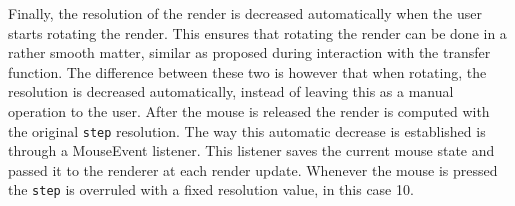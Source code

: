 Finally, the resolution of the render is decreased automatically when the user starts rotating the render. This ensures that rotating the render can be done in a rather smooth matter, similar as proposed during interaction with the transfer function. The difference between these two is however that when rotating, the resolution is decreased automatically, instead of leaving this as a manual operation to the user.
After the mouse is released the render is computed with the original \texttt{step} resolution.
The way this automatic decrease is established is through a MouseEvent listener.
This listener saves the current mouse state and passed it to the renderer at each render update.
Whenever the mouse is pressed the \texttt{step} is overruled with a fixed resolution value, in this case 10.